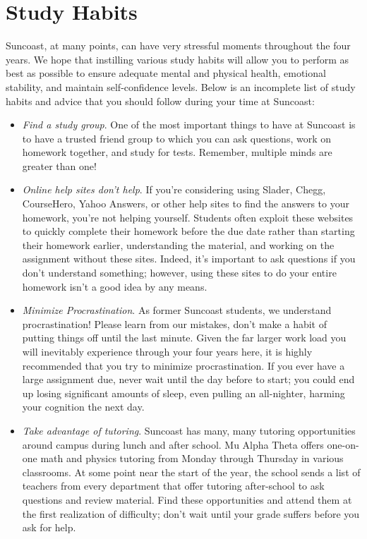 \documentclass[../book.tex]{subfiles}
\begin{document}
\section{Study Habits}
Suncoast, at many points, can have very stressful moments throughout the four years.  We hope that instilling various study habits will allow you to perform as best as possible to ensure adequate mental and physical health, emotional stability, and maintain self-confidence levels.  Below is an incomplete list of study habits and advice that you should follow during your time at Suncoast: \begin{itemize}
    \item \textit{Find a study group}.  One of the most important things to have at Suncoast is to have a trusted friend group to which you can ask questions, work on homework together, and study for tests.  Remember, multiple minds are greater than one!
    \item \textit{Online help sites don't help}.  If you're considering using Slader, Chegg, CourseHero, Yahoo Answers, or other help sites to find the answers to your homework, you're not helping yourself.  Students often exploit these websites to quickly complete their homework before the due date rather than starting their homework earlier, understanding the material, and working on the assignment without these sites.  Indeed, it's important to ask questions if you don't understand something; however, using these sites to do your entire homework isn't a good idea by any means.
    \item \textit{Minimize Procrastination}.  As former Suncoast students, we understand procrastination! Please learn from our mistakes, don't make a habit of putting things off until the last minute.  Given the far larger work load you will inevitably experience through your four years here, it is highly recommended that you try to minimize procrastination.  If you ever have a large assignment due, never wait until the day before to start; you could end up losing significant amounts of sleep, even pulling an all-nighter, harming your cognition the next day.
    \item \textit{Take advantage of tutoring}.  Suncoast has many, many tutoring opportunities around campus during lunch and after school.  Mu Alpha Theta offers one-on-one math and physics tutoring from Monday through Thursday in various classrooms.  At some point near the start of the year, the school sends a list of teachers from every department that offer tutoring after-school to ask questions and review material.  Find these opportunities and attend them at the first realization of difficulty; don't wait until your grade suffers before you ask for help.

\end{itemize}
\end{document}
